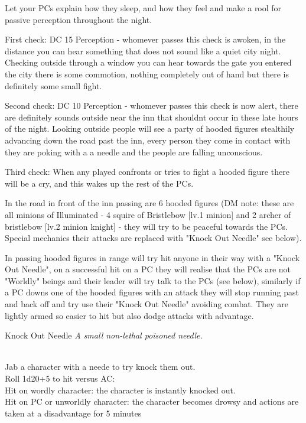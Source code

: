 \documentclass[10pt,twoside,twocolumn]{article}
\begin{document}
Let your PCs explain how they sleep, and how they feel and make a rool for passive perception throughout the night.

First check: DC 15 Perception - whomever passes this check is awoken, in the distance you can hear something that does not sound like a quiet city night. Checking outside through a window you can hear towards the gate you entered the city there is some commotion, nothing completely out of hand but there is definitely some small fight.

Second check: DC 10 Perception - whomever passes this check is now alert, there are definitely sounds outside near the inn that shouldnt occur in these late hours of the night. Looking outside people will see a party of hooded figures stealthily advancing down the road past the inn, every person they come in contact with they are poking with a a needle and the people are falling unconscious.

Third check: When any played confronts or tries to fight a hooded figure there will be a cry, and this wakes up the rest of the PCs.

In the road in front of the inn passing are 6 hooded figures (DM note: these are all minions of Illuminated - 4 squire of Bristlebow [lv.1 minion] and 2 archer of bristlebow [lv.2 minion knight] - they will try to be peaceful towards the PCs. Special mechanics their attacks are replaced with "Knock Out Needle" see below).

In passing hooded figures in range will try hit anyone in their way with a "Knock Out Needle", on a successful hit on a PC they will realise that the PCs are not "Worldly" beings and their leader will try talk to the PCs (see below), similarly if a PC downs one of the hooded figures with an attack they will stop running past and back off and try use their "Knock Out Needle" avoiding combat. They are lightly armed so easier to hit but also dodge attacks with advantage.

\begin{itembox}{Knock Out Needle}
	\textit{A small non-lethal poisoned needle.}\\
	\hline \\[1mm]
	\begin{itemaction}
		Jab a character with a neede to try knock them out.\\
		Roll 1d20+5 to hit versus AC:\\
		Hit on wordly character: the character is instantly knocked out.\\
		Hit on PC or unworldly character: the character becomes drowsy and actions are taken at a disadvantage for 5 minutes
	\end{itemaction}
\end{itembox}
\end{document}
